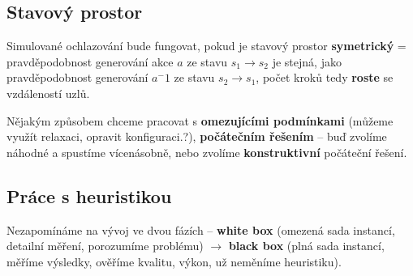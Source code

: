 \subsection{Stavový prostor}

Simulované ochlazování bude fungovat, pokud je stavový prostor \textbf{symetrický} = pravděpodobnost generování akce $a$ ze stavu $s_1 \to s_2$ je stejná, jako pravděpodo\-bnost generování $a^-1$ ze stavu $s_2 \to s_1$, počet kroků tedy \textbf{roste} se vzdáleností uzlů.

\vspace{4pt}
\noindent Nějakým způsobem chceme pracovat s \textbf{omezujícími podmínkami} (můžeme využít relaxaci, opravit konfiguraci.?), \textbf{počátečním řešením} -- buď zvolíme náhodné a spustíme vícenásobně, nebo zvolíme \textbf{konstruktivní} počáteční řešení.

\subsection{Práce s heuristikou}

Nezapomínáme na vývoj ve dvou fázích -- \textbf{white box} (omezená sada instancí, detailní měření, porozumíme problému) $\to$ \textbf{black box} (plná sada instancí, měříme výsledky, ověříme kvalitu, výkon, už neměníme heuristiku).
